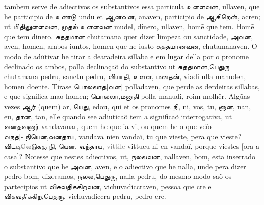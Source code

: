 \documentclass[12pt,a4paper]{scrbook}
\begin{document}
tambem serve de adiectivos os substantivos essa particula உளளவன, ullaven, que 
he participio de உணடு undu et ஆனவன, anaven, participio de ஆகிறென், acren; ut 
மிதிலுளளவன, முதல் உளளவன mudel, dinero, ullaven, homẽ que tem. Homẽ que tem dinero. 
சுததமான chutamana quer dizer limpeza ou sanctidade, அவன, aven, homen, ambos iuntos, homen que he iusto சுததமானவன, chutamanaven. O modo de adïïtivar he tirar 
a dearadeira sillaba e em lugar della por o pronome declinado os ambos, polla declinaçaõ do substantivo ut சுததமான,பெதுரு chutamana pedru, sanctu pedru, வியாதி, 
உளள, மனதன், viadi ulla manuden, homen doente. Tirase பொலலாத[வன] pollādaven, 
que perde as derdeiras sillabas, e que significa mao homen; பொலலா,மனுதி polla 
manudi, roim molhêr.
Algũas vezes ஆர் (quem) ar, யெது, edou, qui et os pronomes நி, ni, vos, tu, னான, 
nan, eu, தான, tan, elle quando see adiuticaõ tem a significaõ interrogativa, ut 
வனதவனார் vandavanar, quem he que ia vi, ou quem he o que veïo வநத[-]நியென,வனதாய, 
vandava nien vandaï, tu que vieste, pera que vieste? விட\sout{\textcolor{gray}{டிலெ}}டுககு நி, யென, வந்தாய, 
\sout{\textcolor{gray}{vittile}} vittucu ni en vandaï, porque viestes [ora a casa]? 
Notesse que nestes adiectivos, ut, நலலவன, nallaven, bom, esta inserrado o substantivo que he அவன, aven, e o adiectivo que he nalla, unde pera dizer pedro 
bom, dize\sout{\textcolor{gray}{ra}}mos, நலல,பெதுரு, nalla pedru, do mesmo modo saõ os partecipios ut 
விசுவதிககிறவன, vichuvadiccraven, pessoa que cre e விசுவதிககிற,பெதுரு, vichuvadiccra 
pedru, pedro cre.
\end{document}
